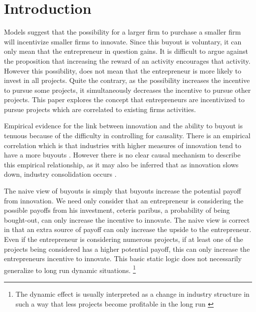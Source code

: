\section{Introduction}

Models suggest that the possibility for a larger firm to purchase a smaller firm will incentivize smaller firms to innovate. Since this buyout is voluntary, it can only mean that the entrepreneur in question gains. It is difficult to argue against the proposition that increasing the reward of an activity encourages that activity. However this possibility, does not mean that the entrepreneur is more likely to invest in all projects. Quite the contrary, as the possibility increases the incentive to pursue some projects, it simultaneously decreases the incentive to pursue other projects. This paper explores the concept that entrepreneurs are incentivized to pursue projects which are correlated to existing firms activities.


Empirical evidence for the link between innovation and the ability to buyout is tenuous because of the difficulty in controlling for causality. There is an empirical correlation which is that industries with higher measures of innovation tend to have a more buyouts \citep{HAU}. However there is no clear causal mechanism to describe this empirical relationship, as it may also be inferred that as innovation slows down, industry consolidation occurs \citep{COM}. 

The naive view of buyouts is simply that buyouts increase the potential payoff from innovation. We need only consider that an entrepreneur is considering the possible payoffs from his investment, ceteris paribus, a probability of being bought-out, can only increase the incentive to innovate. The naive view is correct in that an extra source of payoff can only increase the upside to the entrepreneur. Even if the entrepreneur is considering numerous projects, if at least one of the projects being considered has a higher potential payoff, this can only increase the entrepreneurs incentive to innovate. This basic static logic does not necessarily generalize to long run dynamic situations. \footnote{The dynamic effect is usually interpreted as a change in industry structure in such a way that less projects become profitable in the long run \cite{bessen_maskin}}

